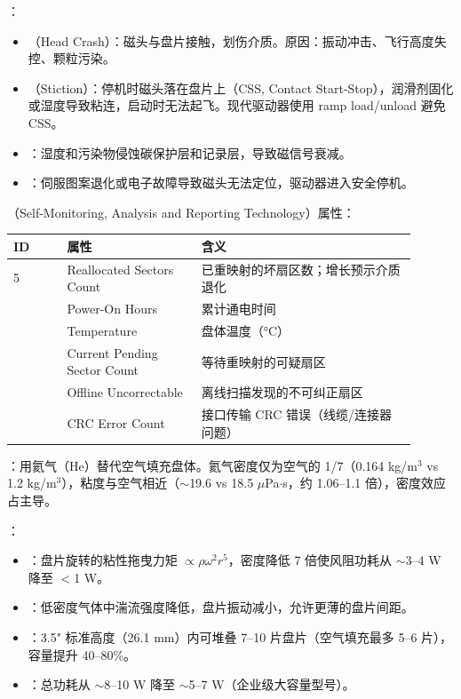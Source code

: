 ：
\begin{itemize}
\item {}（Head Crash）：磁头与盘片接触，划伤介质。原因：振动冲击、飞行高度失控、颗粒污染。
\item {}（Stiction）：停机时磁头落在盘片上（CSS, Contact Start-Stop），润滑剂固化或湿度导致粘连，启动时无法起飞。现代驱动器使用 ramp load/unload 避免 CSS。
\item {}：湿度和污染物侵蚀碳保护层和记录层，导致磁信号衰减。
\item {}：伺服图案退化或电子故障导致磁头无法定位，驱动器进入安全停机。
\end{itemize}

（Self-Monitoring, Analysis and Reporting Technology）属性：

\begin{longtable}{L{0.12\linewidth}L{0.3\linewidth}L{0.48\linewidth}}
\toprule
ID & 属性 & 含义 \\
 & Reallocated Sectors Count & 已重映射的坏扇区数；增长预示介质退化 \\ & Power-On Hours & 累计通电时间 \\ & Temperature & 盘体温度（°C） \\ & Current Pending Sector Count & 等待重映射的可疑扇区 \\ & Offline Uncorrectable & 离线扫描发现的不可纠正扇区 \\ & CRC Error Count & 接口传输 CRC 错误（线缆/连接器问题） \\
\bottomrule
\end{longtable}


：用氦气（He）替代空气填充盘体。氦气密度仅为空气的 1/7（0.164 kg/m$^3$ vs 1.2 kg/m$^3$），粘度与空气相近（$\sim$19.6 vs 18.5 $\mu$Pa$\cdot$s，约 1.06--1.1 倍），密度效应占主导。

：
\begin{itemize}
\item {}：盘片旋转的粘性拖曳力矩 $\propto \rho \omega^2 r^5$，密度降低 7 倍使风阻功耗从 $\sim$3--4 W 降至 $<$1 W。
\item {}：低密度气体中湍流强度降低，盘片振动减小，允许更薄的盘片间距。
\item {}：3.5" 标准高度（26.1 mm）内可堆叠 7--10 片盘片（空气填充最多 5--6 片），容量提升 40--80\%。
\item {}：总功耗从 $\sim$8--10 W 降至 $\sim$5--7 W（企业级大容量型号）。
\end{itemize}

